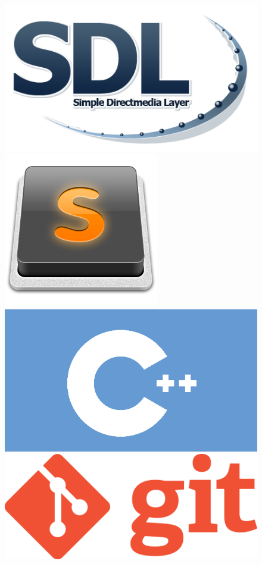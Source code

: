 \documentclass[11pt]{article} %
\begin{document}
\begin{figure}[tb]
\begin{center}
  \includegraphics[scale=0.25]{res/Sdl-logo.png} \quad
  \includegraphics[scale=0.3]{res/Sublime_Text_Logo.png} \quad
  \includegraphics[scale=0.2]{res/cpp.png} \quad
  \includegraphics[scale=0.13]{res/git.png} \quad

\end{center}
\end{figure}
\end{document}
